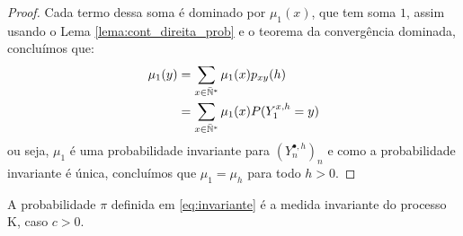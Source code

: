 \begin{proof}
  Cada termo dessa soma é dominado por $\mu_1(x)$, que tem soma $1$,
  assim usando o Lema \ref{lema:cont_direita_prob} e o teorema da
  convergência dominada, concluímos que:
  \begin{align*}
    \mu_1 (y) &= \sum_{x \in {\mathbb{\bar{N}^*}}} \mu_1(x) p_{x y} (h)\\
    &= \sum_{x \in {\mathbb{\bar{N}^*}}} \mu_1(x) P(Y_1^{x, h} = y)\\
  \end{align*}
  ou seja, $\mu_1$ é uma probabilidade invariante para $(Y_n^{\bullet,
    h})_n $ e como a probabilidade invariante é única, concluímos que
  $\mu_1 = \mu_h$ para todo $h > 0$.
\end{proof}


\begin{proposicao}
  A probabilidade $\pi$ definida em \eqref{eq:invariante} é a medida
  invariante do processo K, caso $c > 0$.
\end{proposicao}
